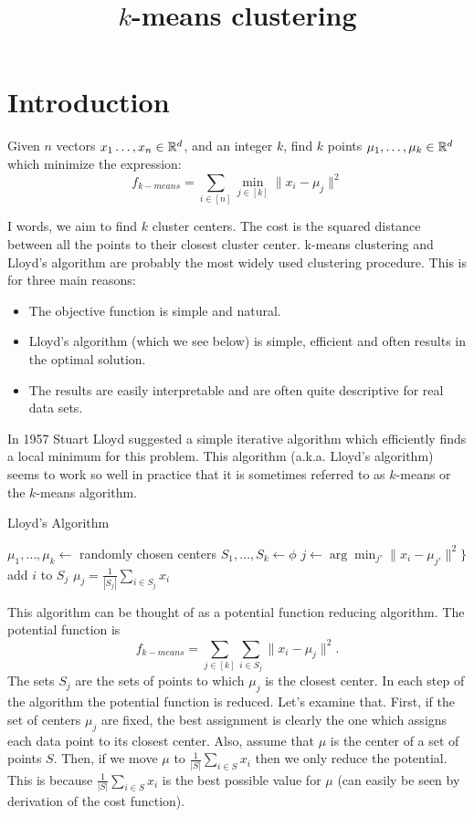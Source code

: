 \documentclass{article}
\title{$k$-means clustering}
\date{\nonumber}
\begin{document}
\maketitle


\section{Introduction}
\begin{definition}[$k$-means]
Given $n$ vectors $x_1\ldots,x_n\in {\mathbb{R}}^d$, and an integer $k$, find $k$ points $\mu_1,\ldots,\mu_k \in {\mathbb{R}}^d$
which minimize the expression:
\[
f_{k-means} = \sum_{i \in [n]} \min_{j \in [k]} \|x_i - \mu_j \|^2
\]
\end{definition}
I words, we aim to find $k$ cluster centers. The cost is the squared distance between all the points to their closest cluster center.
k-means clustering and Lloyd's algorithm \cite{Lloyd82leastsquares} are probably the most widely used clustering procedure.
This is for three main reasons:
\begin{itemize} 
\item The objective function is simple and natural.
\item Lloyd's algorithm (which we see below) is simple, efficient and often results in the optimal solution.  
\item The results are easily interpretable and are often quite descriptive for real data sets. 
\end{itemize}
In 1957 Stuart Lloyd suggested a simple iterative algorithm which efficiently finds a local minimum for this problem.
This algorithm (a.k.a. Lloyd's algorithm) seems to work so well in practice that it is sometimes referred to as $k$-means or the $k$-means algorithm.

\begin{algorithm}
\caption{Lloyd's Algorithm}
\begin{algorithmic}
\STATE $\mu_1,\ldots,\mu_k \leftarrow$ randomly chosen centers
\STATE $S_1,\ldots,S_k \leftarrow \phi$
	\STATE $j \leftarrow \arg\min_{j'}\|x_i - \mu_{j'}\|^2 \}$
	\STATE add $i$ to $S_j$
\ENDFOR
{}
	\STATE $\mu_j = \frac{1}{|S_j|}\sum_{i \in S_j} x_i$
\ENDFOR
\ENDWHILE
\end{algorithmic}
\end{algorithm}
This algorithm can be thought of as a potential function reducing algorithm.
The potential function is 
\[
f_{k-means} = \sum_{j \in [k]} \sum_{i \in S_j} \|x_i - \mu_j\|^2.
\]
The sets $S_j$ are the sets of points to which $\mu_j$ is the closest center.
In each step of the algorithm the potential function is reduced.
Let's examine that.
First, if the set of centers $\mu_j$ are fixed, the best assignment is clearly the one which assigns
each data point to its closest center. Also, assume that $\mu$ is the center of a set of points $S$.
Then, if we move $\mu$ to $\frac{1}{|S|}\sum_{i \in S} x_i$ then we only reduce the potential.
This is because $\frac{1}{|S|}\sum_{i \in S} x_i$ is the best possible value for $\mu$ (can easily be seen by derivation of the cost function).
\end{document}
